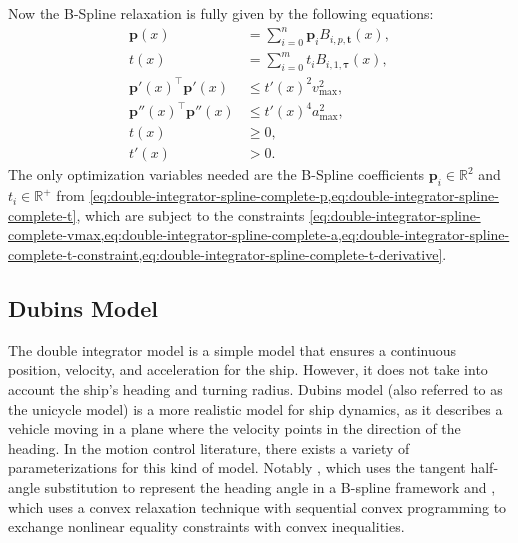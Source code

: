 Now the B-Spline relaxation is fully given by the following equations:
\begin{subequations}\label{eq:double-integrator-spline-complete}
    \begin{align}
        \mathbf{p}(x) &= \sum_{i=0}^{n} \mathbf{p}_i B_{i,p,\mathbf{t}}(x), \label{eq:double-integrator-spline-complete-p} \\
        t(x) &= \sum_{i=0}^{m} t_i B_{i,1,\boldsymbol{\tau}}(x), \label{eq:double-integrator-spline-complete-t} \\
        \mathbf{p}'(x) ^\top \mathbf{p}'(x) &\leq t'(x)^2v_{\max}^2, \label{eq:double-integrator-spline-complete-vmax} \\
        \mathbf{p}''(x) ^\top \mathbf{p}''(x) &\leq t'(x)^4a_{\max}^2, \label{eq:double-integrator-spline-complete-a} \\
        t(x) &\geq 0, \label{eq:double-integrator-spline-complete-t-constraint} \\
        t'(x) &> 0. \label{eq:double-integrator-spline-complete-t-derivative} \end{align}
\end{subequations}
The only optimization variables needed are the B-Spline coefficients $\mathbf{p}_i\in\mathbb{R}^2$ and $t_i\in\mathbb{R}^+$ from \cref{eq:double-integrator-spline-complete-p,eq:double-integrator-spline-complete-t}, which are subject to the constraints \cref{eq:double-integrator-spline-complete-vmax,eq:double-integrator-spline-complete-a,eq:double-integrator-spline-complete-t-constraint,eq:double-integrator-spline-complete-t-derivative}.


\subsection{Dubins Model}\label{sec:dubins-model}

The double integrator model is a simple model that ensures a continuous position, velocity, and acceleration for the ship. However, it does not take into account the ship's heading and turning radius. Dubins model (also referred to as the unicycle model) is a more realistic model for ship dynamics, as it describes a vehicle moving in a plane where the velocity points in the direction of the heading. In the motion control literature, there exists a variety of parameterizations for this kind of model. Notably \citet{mercy2017spline}, which uses the tangent half-angle substitution to represent the heading angle in a B-spline framework and \citet{Wang2020}, which uses a convex relaxation technique with sequential convex programming to exchange nonlinear equality constraints with convex inequalities. 

